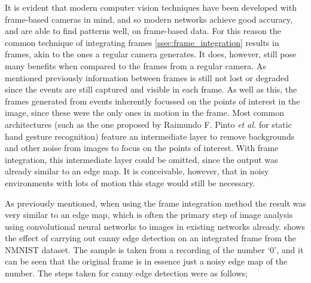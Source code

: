 It is evident that modern computer vision techniques have been developed with frame-based cameras in mind, and so modern networks achieve good accuracy, and are able to find patterns well, on frame-based data. For this reason the common technique of integrating frames \cref{ssec:frame_integration} results in frames, akin to the ones a regular camera generates. It does, however, still pose many benefits when compared to the frames from a regular camera. As mentioned previously information between frames is still not lost or degraded since the events are still captured and visible in each frame. As well as this, the frames generated from events inherently focussed on the points of interest in the image, since these were the only ones in motion in the frame. Most common architectures (such as the one proposed by Raimundo F. Pinto \textit{et al.} for static hand gesture recognition\cite{StaticHandGesture}) feature an intermediate layer to remove backgrounds and other noise from images to focus on the points of interest. With frame integration, this intermediate layer could be omitted, since the output was already similar to an edge map. It is conceivable, however, that in noisy environments with lots of motion this stage would still be necessary.

As previously mentioned, when using the frame integration method the result was very similar to an edge map, which is often the primary step of image analysis using convolutional neural networks to images in existing networks already.  shows the effect of carrying out canny edge detection\cite{CannyEdgeDetection} on an integrated frame from the NMNIST dataset. The sample is taken from a recording of the number `0', and it can be seen that the original frame is in essence just a noisy edge map of the number. The steps taken for canny edge detection were as follows;

